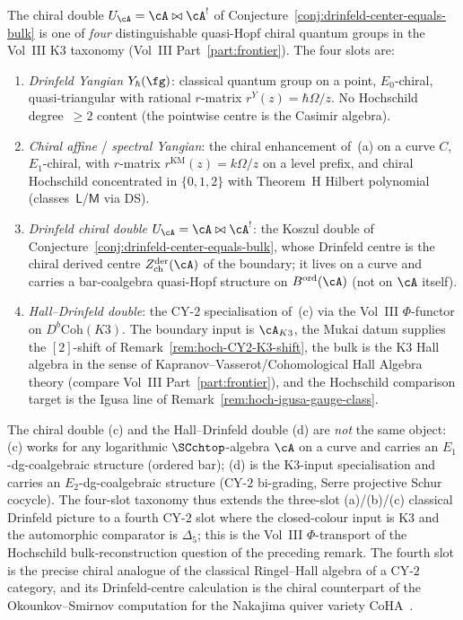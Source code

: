 \begin{remark}
\label{rem:hoch-hall-drinfeld-fourth-slot}
%
%
%
The chiral double $U_\cA=\cA\bowtie\cA^!$ of
Conjecture~\ref{conj:drinfeld-center-equals-bulk} is one of
\emph{four} distinguishable quasi-Hopf chiral quantum groups in the
Vol~III K3 taxonomy (Vol~III Part~\ref{part:frontier}). The
four slots are:
\begin{enumerate}[label=\textup{(\alph*)}]
\item \emph{Drinfeld Yangian} $Y_\hbar(\fg)$: classical quantum
 group on a point, $E_0$-chiral, quasi-triangular with rational
 $r$-matrix $r^Y(z)=\hbar\Omega/z$. No Hochschild degree~$\geq 2$
 content (the pointwise centre is the Casimir algebra).
\item \emph{Chiral affine} / \emph{spectral Yangian}: the chiral
 enhancement of~(a) on a curve $C$, $E_1$-chiral, with
 $r$-matrix $r^{\mathrm{KM}}(z)=k\Omega/z$ on a level prefix, and
 chiral Hochschild concentrated in $\{0,1,2\}$ with Theorem~H
 Hilbert polynomial (classes~$\mathsf{L}$/$\mathsf{M}$ via DS).
\item \emph{Drinfeld chiral double} $U_\cA=\cA\bowtie\cA^!$: the
 Koszul double of Conjecture~\ref{conj:drinfeld-center-equals-bulk},
 whose Drinfeld centre is the chiral derived centre
 $Z^{\mathrm{der}}_{\mathrm{ch}}(\cA)$ of the boundary; it
 lives on a curve and carries a bar-coalgebra quasi-Hopf structure
 on $B^{\mathrm{ord}}(\cA)$ (not on $\cA$ itself).
\item \emph{Hall--Drinfeld double}: the CY-$2$ specialisation of~(c)
 via the Vol~III $\Phi$-functor on $D^b\mathrm{Coh}(K3)$. The
 boundary input is $\cA_{K3}$, the Mukai datum supplies the
 $[2]$-shift of Remark~\ref{rem:hoch-CY2-K3-shift}, the bulk
is the K3 Hall algebra in the sense of
Kapranov--Vasserot/Cohomological Hall Algebra theory
(compare Vol~III Part~\ref{part:frontier}), and the
Hochschild comparison target is the Igusa line of
Remark~\ref{rem:hoch-igusa-gauge-class}.
\end{enumerate}
The chiral double (c) and the Hall--Drinfeld double (d) are
\emph{not} the same object: (c) works for any logarithmic
$\SCchtop$-algebra $\cA$ on a curve and carries an
$E_1$-dg-coalgebraic structure (ordered bar); (d) is the K3-input
specialisation and carries an $E_2$-dg-coalgebraic structure
(CY-$2$ bi-grading, Serre projective Schur cocycle). The
four-slot taxonomy thus extends the three-slot (a)/(b)/(c) classical
Drinfeld picture to a fourth CY-$2$ slot where the closed-colour
input is K3 and the automorphic comparator is $\Delta_5$; this is the
Vol~III $\Phi$-transport of the Hochschild bulk-reconstruction
question of the preceding remark. The fourth slot is the precise
chiral analogue of the classical Ringel--Hall algebra of a CY-$2$
category, and its Drinfeld-centre calculation is the chiral
counterpart of the Okounkov--Smirnov computation for the
Nakajima quiver variety CoHA~\cite{OkounkovSmirnov16}.
\end{remark}

